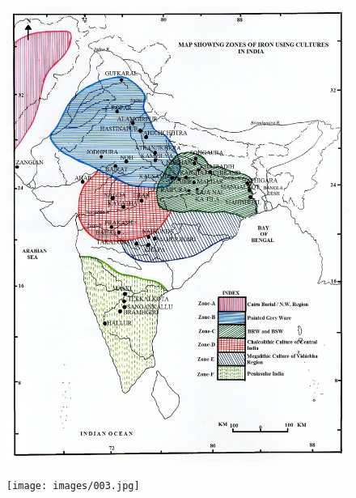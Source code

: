\newpage

\begin{figure}[H]
\includegraphics[scale=.98]{images/002.jpg}
\caption{}\label{chap1-fig2}
\end{figure}

\newpage

\begin{figure}[H]
\texttt{[image: images/003.jpg]}
\caption{}\label{chap1-fig3}
\end{figure}

\newpage

